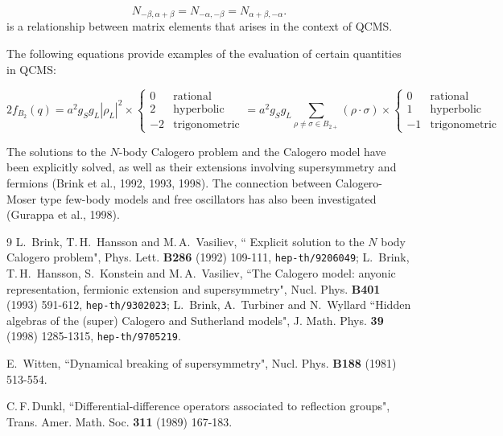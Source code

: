 \documentclass[12pt]{article}
\begin{document}
{\begin{equation}
N_{-\beta,\alpha+\beta} = N_{-\alpha,-\beta}  = N_{\alpha+\beta,-\alpha}.
\label{eq:three-N}
\end{equation}
is a relationship between matrix elements that arises in the context of QCMS.

The following equations provide examples of the evaluation of certain quantities in QCMS:

\begin{equation}
2f_{B_{2}}(q)=a^2g_Sg_L|\rho_L|^2\times
   \left\{
   \begin{array}{rl}
      0& \mbox{rational}\\
      2&\mbox{hyperbolic}\\
      -2&\mbox{trigonometric}
   \end{array}\right.\!\!\! =
   a^2g_Sg_L\sum_{\rho\neq \sigma\in B_{2+}
   }(\rho\cdot\sigma)
   \times\left\{
   \begin{array}{rl}
      0& \mbox{rational}\\
      1&\mbox{hyperbolic}\\
      -1&\mbox{trigonometric}
   \end{array}\right.
   \label{fB2val}
\end{equation}

The solutions to the $N$-body Calogero problem and the Calogero model have been explicitly solved, as well as their extensions involving supersymmetry and fermions (Brink et al., 1992, 1993, 1998). The connection between Calogero-Moser type few-body models and free oscillators has also been investigated (Gurappa et al., 1998).

\begin{thebibliography}{9}
L.\, Brink, T.\,H.\, Hansson and M.\,A.\, Vasiliev, `` Explicit solution
to
the $N$ body Calogero problem", Phys. Lett. {\bf B286} (1992) 109-111,
{\tt hep-th/9206049};
L.\, Brink, T.\,H.\, Hansson, S.\, Konstein and M.\,A.\, Vasiliev,
``The Calogero model: anyonic representation, fermionic extension and
supersymmetry", Nucl. Phys. {\bf B401} (1993) 591-612,
{\tt hep-th/9302023};
L.\, Brink, A.\, Turbiner and N.\, Wyllard ``Hidden algebras of the
(super) Calogero and Sutherland models", J. Math. Phys. {\bf 39} (1998)
1285-1315,  {\tt hep-th/9705219}.

E.\, Witten, ``Dynamical breaking of supersymmetry",  Nucl. Phys. {\bf B188}
(1981) 513-554.

C.\,F.\,Dunkl, ``Differential-difference operators associated to
reflection groups", Trans. Amer. Math. Soc. {\bf 311} (1989) 167-183.


\end{thebibliography}}
\end{document}
